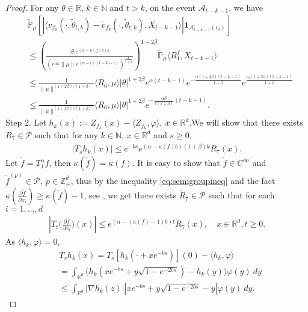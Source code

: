 \documentclass[12pt,oneside,english]{amsart}
\theoremstyle{plain}
\theoremstyle{definition}
\numberwithin{equation}{section}
\begin{document}
\begin{proof}
For any $\theta\in \mathbb{R}$, $k\in \mathbb{N}$ and $t>k$, on the event $\mathcal{A}_{t-k-1}$, we have
    \begin{align*}
        &\mathbb{\tilde{P}}_{\mu}\left[\left|\langle v_{f_k}(\cdot,\tilde{\theta}_{t,k})-\tilde{v}_{f_k}(\cdot,\tilde{\theta}_{t,k}), X_{t-k-1}\rangle\right|\mathbf{1}_{\mathcal{A}_{t-k-1}(\epsilon_0)}\right]
        \\ &\leq \left(\frac{|\theta|e^{(\alpha-\kappa(f)b)k}}{(e^{\alpha k}\|\mu\|e^{(\alpha-\epsilon)(t-k-1)})^\frac{1}{1+\beta}}\right)^{1+2\beta}\mathbb{\tilde{P}}_{\mu}\langle R^f_1,X_{t-k-1}\rangle\\
        &\leq\frac{1}{\|\mu\|^{(1+2\beta)/(1+\beta)}}\langle R_6,\mu\rangle|\theta|^{1+2\beta}e^{\alpha(t-k-1)} e^{-\frac{\alpha(1+2\beta)(t-k-1)}{1+\beta}}e^{\frac{\epsilon_0(1+2\beta)(t-k-1)}{1+\beta}}\\
        &\leq \frac{1}{\|\mu\|^{(1+2\beta)/(1+\beta)}}\langle R_6,\mu\rangle|\theta|^{1+2\beta}e^{-\frac{\alpha\beta}{2(1+\beta)}(t-k-1)}.
    \end{align*}
 Step 2. Let $h_k(x):=Z_{f_k}(x)-\langle Z_{f_k},\varphi\rangle,~x\in\mathbb{R}^d$.We will show that there exists $R_7\in \mathcal{P}$ such that for any $k\in\mathbb{N}$, $x\in \mathbb{R}^d$ and $s\geq 0$,
 \begin{align}
 \label{eq:31step2}
     |T_s h_k(x)|\leq e^{-bs}e^{(\alpha-\kappa(f)b)(1+\beta)k}R_7(x).
 \end{align}
 Let $\tilde{f}=T_1^{\alpha}f$, then $\kappa(\tilde{f})=\kappa(f)$. It is easy to show that $\tilde{f}\in C^{\infty}$ and $\tilde{f}^{(p)}\in\mathcal{P},~p\in\mathbb{Z}_+^d$, thus by the inequality \eqref{eq:semigroupineq} and the fact $\kappa\left(\frac{\partial \tilde{f}}{\partial x_i}\right)\geq \kappa(\tilde{f})-1$, see \cite[Lemma 2.3]{RSZ}, we get there exists $\tilde{R}_7\in \mathcal{P}$ such that for each $i=1,...,d$
 \begin{align}
 \label{ineq-temp}
     \left|T_t\big(\frac{\partial\tilde{f}}{\partial x_i}\big)(x)\right|\leq e^{(\alpha-(\kappa(f)-1)b)t}\tilde{R}_7(x), \quad x\in \mathbb {R}^d, t\geq 0.
 \end{align}
 As $\langle h_k,\varphi\rangle=0$,
 \begin{align}
     &T_s h_k(x)= T_s [h_k(\cdot+xe^{-bs})] (0)-\langle h_k,\varphi\rangle
     \\ &= \int_{\mathbb{R}^d}\big(h_k(xe^{-bs}+y\sqrt{1-e^{-2bs}})-h_k(y)\big)\varphi (y)~dy
     \\ &\leq \int_{\mathbb{R}^d}|\nabla h_k(z)||xe^{-bs}+y\sqrt{1-e^{-2bs}}-y|\varphi (y)~dy.

\end{align}
\end{proof}
\end{document}
